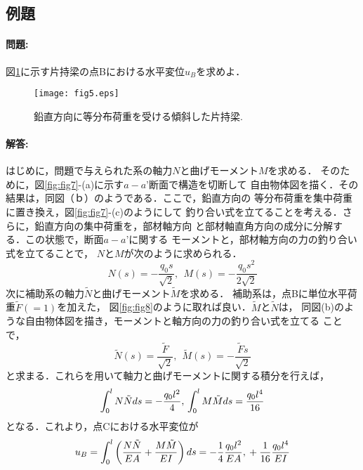 ﻿\documentclass[10pt,a4j]{jarticle}
\begin{document}
\subsection{例題}
\paragraph{問題:}
図\ref{fig:fig5}に示す片持梁の点Bにおける水平変位$u_B$を求めよ．
\begin{figure}[h]
	\begin{center}
	\texttt{[image: fig5.eps]} 
	\end{center}
	\caption{鉛直方向に等分布荷重を受ける傾斜した片持梁.} 
	\label{fig:fig5}
\end{figure}
\paragraph{解答:}
はじめに，問題で与えられた系の軸力$N$と曲げモーメント$M$を求める．
そのために，図\ref{fig:fig7}-(a)に示す$a-a’$断面で構造を切断して
自由物体図を描く．その結果は，同図（ｂ）のようである．ここで，鉛直方向の
等分布荷重を集中荷重に置き換え，図\ref{fig:fig7}-(c)のようにして
釣り合い式を立てることを考える．さらに，鉛直方向の集中荷重を，部材軸方向
と部材軸直角方向の成分に分解する．この状態で，断面$a-a’$に関する
モーメントと，部材軸方向の力の釣り合い式を立てることで，
$N$と$M$が次のように求められる．
\begin{equation}
	N(s)=-\frac{q_0s}{\sqrt{2}}, \ \ 
	M(s)=-\frac{q_0s^2}{2\sqrt{2}}
	\label{eqn:}
\end{equation}
次に補助系の軸力$\tilde N$と曲げモーメント$\tilde M$を求める．
補助系は，点Bに単位水平荷重$\tilde F(=1)$を加えた，
図\ref{fig:fig8}のように取れば良い．$\tilde M$と$\tilde N$は，
同図(b)のような自由物体図を描き，モーメントと軸方向の力の釣り合い式を立てる
ことで，
\begin{equation}
	\tilde N(s)=\frac{\tilde F}{\sqrt{2}}, \ \ 
	\tilde M(s)=-\frac{\tilde F s}{\sqrt{2}}
	\label{eqn:}
\end{equation}
と求まる．これらを用いて軸力と曲げモーメントに関する積分を行えば，
\begin{equation}
	\int_0^l N \tilde N ds = -\frac{q_0l^2}{4}, \\
	\int_0^l M \tilde M ds = \frac{q_0l^4}{16}
	\label{eqn:}
\end{equation}
となる．これより，点Cにおける水平変位が
\begin{equation}
	u_B=
	\int_0^l \left( 
		\frac{N \tilde N }{EA}
		+
		\frac{M \tilde M }{EI}
	\right)
	ds 
	= 
	 -\frac{1}{4}\frac{q_0l^2}{EA}, \\
	 +\frac{1}{16}\frac{q_0l^4}{EI}
	\label{eqn:}
\end{equation}
\end{document}
